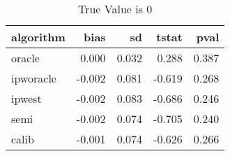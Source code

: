 \begin{table}

\caption{True Value is 0}
\centering
\begin{tabular}[t]{lrrrr}
\toprule
algorithm & bias & sd & tstat & pval\\
\midrule
oracle & 0.000 & 0.032 & 0.288 & 0.387\\
ipworacle & -0.002 & 0.081 & -0.619 & 0.268\\
ipwest & -0.002 & 0.083 & -0.686 & 0.246\\
semi & -0.002 & 0.074 & -0.705 & 0.240\\
calib & -0.001 & 0.074 & -0.626 & 0.266\\
\bottomrule
\end{tabular}
\end{table}